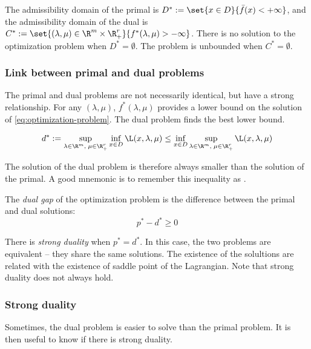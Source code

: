 \documentclass[toc, titlepaged]{../cs-classes/cs-classes}
\begin{document}
The admissibility domain of the primal is $D^* := \set{x\in D}{\bar{f}(x)<+\infty}$, and the admissibility domain of the dual is $C^* := \set{(\lambda, \mu)\in\R^m\times\R_+^r}{f^*(\lambda, \mu)>-\infty}$. There is no solution to the optimization problem when $D^*=\emptyset$. The problem is unbounded when $C^*=\emptyset$.

\subsubsection{Link between primal and dual problems}
The primal and dual problems are not necessarily identical, but have a strong relationship. For any $(\lambda, \mu)$, $f^*(\lambda, \mu)$ provides a lower bound on the solution of \eqref{eq:optimization-problem}. The dual problem finds the best lower bound.

\begin{property}
    \begin{equation*}
        d^* := \sup_{\lambda\in\R^m, \;\mu\in\R^r_+} \inf_{x\in D}\L(x, \lambda, \mu) \leq \inf_{x\in D} \sup_{\lambda\in\R^m, \;\mu\in\R^r_+} \L(x, \lambda, \mu)
    \end{equation*}    
\end{property}
The solution of the dual problem is therefore always smaller than the solution of the primal. A good mnemonic is to remember this inequality as .

\begin{definition}
    The \emph{dual gap} of the optimization problem is the difference between the primal and dual solutions:
    \begin{equation*}
        p^*-d^* \geq 0
    \end{equation*}
\end{definition}

\begin{definition}
    There is \emph{strong duality} when $p^*=d^*$. In this case, the two problems are equivalent -- they share the same solutions. The existence of the solultions are related with the existence of saddle point of the Lagrangian. Note that strong duality does not always hold.
\end{definition}

\subsubsection{Strong duality}
Sometimes, the dual problem is easier to solve than the primal problem. It is then useful to know if there is strong duality.
\end{document}
